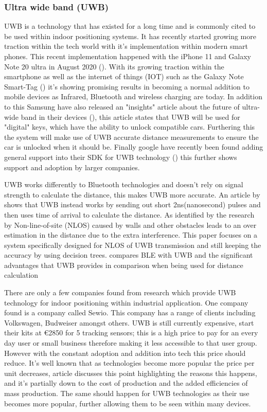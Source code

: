 \subsubsection{Ultra wide band (UWB)}
UWB is a technology that has existed for a long time and is commonly cited to be used within indoor positioning systems. It has recently started growing more traction within the tech world with it's implementation within modern smart phones. This recent implementation happened with the iPhone 11 and Galaxy Note 20 ultra in August 2020 (\cite{vyas_2021_google}). With its growing traction within the smartphone as well as the internet of things (IOT) such as the Galaxy Note Smart-Tag (\cite{samsung_2021_introducing}) it's showing promising results in becoming a normal addition to mobile devices as Infrared, Bluetooth and wireless charging are today. In addition to this Samsung have also released an "insights" article about the future of ultra-wide band in their devices (\cite{samsung_2021_what}), this article states that UWB will be used for "digital" keys, which have the ability to unlock compatible cars. Furthering this the system will make use of UWB accurate distance measurements to ensure the car is unlocked when it should be. Finally google have recently been found adding general support into their SDK for UWB technology (\cite{vyas_2021_google}) this further shows support and adoption by larger companies. 

UWB works differently to Bluetooth technologies and doesn't rely on signal strength to calculate the distance, this makes UWB more accurate. An article by \cite{connell_2015_stackpath} shows that UWB instead works by sending out short 2ns(nanosecond) pulses and then uses time of arrival to calculate the distance. As identified by the research by \cite{musa_2019_a} Non-line-of-site (NLOS) caused by walls and other obstacles leads to an over estimation in the distance due to the extra interference. This paper focuses on a system specifically designed for NLOS of UWB transmission and still keeping the accuracy by using decision trees. \cite{comer_uwb_vs_ble} compares BLE with UWB and the significant advantages that UWB provides in comparison when being used for distance calculation 

There are only a few companies found from research which provide UWB technology for indoor positioning within industrial application. One company found is a company called Sewio. This company has a range of clients including Volkswagen, Budweiser amongst others. UWB is still currently expensive, \cite{sewio_2021_realtime} start their kits at €2850 for 5 tracking sensors; this is a high price to pay for an every day user or small business therefore making it less accessible to that user group. However with the constant adoption and addition into tech this price should reduce. It's well known that as technologies become more popular the price per unit decreases, \cite{tuovila_2021_marginal} article discusses this point highlighting the reasons this happens, and it's partially down to the cost of production and the added efficiencies of mass production. The same should happen for UWB technologies as their use becomes more popular, further allowing them to be seen within many devices. 

